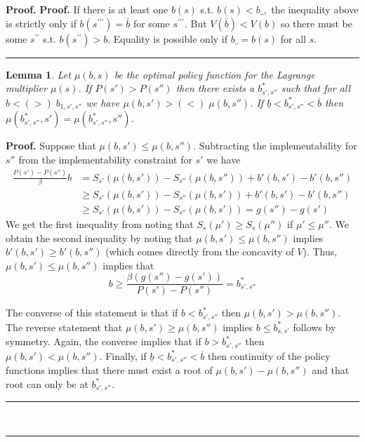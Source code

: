 \documentclass[thmsb,11pt]{article}
\newtheorem{lemma}{Lemma}
\newenvironment{proof}[1][Proof]{\noindent \textbf{#1.} }{\  \rule{0.5em}{0.5em}}
\begin{document}
\begin{proof}
\begin{proof}
If there is at least one $b\left( s\right) $ s.t. $b\left(
s\right) <b\_,$ the inequality above is strictly only if $b\left(
s^{\prime \prime \prime }\right) =\bar{b}$ for some $s^{\prime \prime \prime
}.$ But $V\left( \bar{b}\right) <V\left(
b\right) $ so there must be some $s^{\prime \prime }$ s.t. $b\left(
s^{\prime \prime }\right) >b.$ Equality is possible only if $b\_=b\left(
s\right) $ for all $s.$
\end{proof}


\begin{lemma}  Let $\mu(b,s)$ be the optimal policy function for the Lagrange multiplier $\mu(s)$.  If $P(s') > P(s'')$ then there exists a $b^*_{s',s''}$ such that for all $b < (>) \; b_{1,s',s''}$ we have $\mu(b,s') > (<) \;\mu(b,s'')$.  If $\underline b < b^*_{s',s''} < \overline b$ then $\mu(b^*_{s',s''},s') = \mu(b^*_{s',s''},s'')$.
\label{lem.order}
\end{lemma}
\begin{proof}
Suppose that $\mu(b,s')\leq \mu(b,s'')$.  Subtracting the implementability for $s''$ from the implementability constraint for $s'$ we have
\begin{align*}
	\frac{P(s')-P(s'')}{\beta}b &= S_{s'}(\mu(b,s'))-S_{s''}(\mu(b,s'')) + b'(b,s')-b'(b,s'')\\
						&\geq S_{s'}(\mu(b,s')) -S_{s''}(\mu(b,s')) + b'(b,s')-b'(b,s'')\\
						&\geq  S_{s'}(\mu(b,s')) -S_{s''}(\mu(b,s')) = g(s'')-g(s')
\end{align*}  We get the first inequality from noting that $S_s(\mu')\geq S_s(\mu'')$ if $\mu' \leq \mu''$.  We obtain the second inequality by noting that $\mu(b,s')\leq \mu(b,s'')$ implies $b'(b,s')\geq b'(b,s'')$ (which comes directly from the concavity of $V$).
Thus, $\mu(b,s')\leq \mu(b,s'')$ implies that
\begin{equation}
\label{pair-wise ss}
b \geq \frac{\beta(g(s'')-g(s'))}{P(s')-P(s'')} = b^*_{s',s''}
\end{equation}

The converse of this statement is that if $b<b^*_{s',s''}$ then $\mu(b,s') > \mu(b,s'')$.  The reverse statement that $\mu(b,s') \geq \mu(b,s'')$ implies $b \leq b^*_{s,s'}$ follows by symmetry.   Again, the converse implies that if $b > b^*_{s',s''}$ then $\mu(b,s') < \mu(b,s'')$.    Finally, if $\underline b < b^*_{s',s''} <\overline b$ then continuity of the policy functions implies that there must exist a root of $\mu(b,s')-\mu(b,s'')$ and that root can only be at $b^*_{s',s''}$.
\end{proof}



\end{proof}
\end{document}
